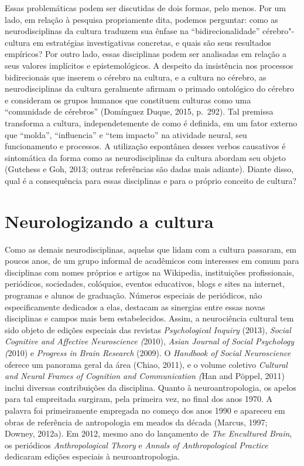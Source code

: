 Essas problemáticas podem ser discutidas de dois formas, pelo menos. Por
um lado, em relação à pesquisa propriamente dita, podemos perguntar:
como as neurodisciplinas da cultura traduzem sua ênfase na
``bidirecionalidade'' cérebro"-cultura em estratégias investigativas
concretas, e quais são seus resultados empíricos? Por outro lado, essas
disciplinas podem ser analisadas em relação a seus valores implícitos e
epistemológicos. A despeito da insistência nos processos bidirecionais
que inserem o cérebro na cultura, e a cultura no cérebro, as
neurodisciplinas da cultura geralmente afirmam o primado ontológico do
cérebro e consideram os grupos humanos que constituem culturas como uma
``comunidade de cérebros'' (Domínguez Duque, 2015, p.~292). Tal premissa
transforma a cultura, independetemente de como é definida, em um fator
externo que ``molda'', ``influencia'' e ``tem impacto'' na atividade
neural, seu funcionamento e processos. A utilização espontânea desses
verbos causativos é sintomática da forma como as neurodisciplinas da
cultura abordam seu objeto (Gutchess e Goh, 2013; outras referências são
dadas mais adiante). Diante disso, qual é a consequência para essas
disciplinas e para o próprio conceito de cultura?

\section{Neurologizando a cultura}

Como as demais neurodisciplinas, aquelas que lidam com a cultura
passaram, em poucos anos, de um grupo informal de acadêmicos com
interesses em comum para disciplinas com nomes próprios e artigos na
Wikipedia, instituições profissionais, periódicos, sociedades,
colóquios, eventos educativos, blogs e sites na internet, programas e
alunos de graduação. Números especiais de periódicos, não
especificamente dedicados a elas, destacam as sinergias entre essas
novas disciplinas e campos mais bem estabelecidos. Assim, a neurociência
cultural tem sido objeto de edições especiais das revistas
\emph{Psychological Inquiry} (2013), \emph{Social Cognitive and
Affective Neuroscience (}2010), \emph{Asian Journal of Social Psychology
(}2010) e \emph{Progress in Brain Research} (2009). O \emph{Handbook of
Social Neuroscience} oferece um panorama geral da área (Chiao, 2011), e
o volume coletivo \emph{Cultural and Neural Frames of Cognition and
Communication (}Han and Pöppel, 2011) inclui diversas contribuições da
disciplina. Quanto à neuroantropologia, os apelos para tal empreitada
surgiram, pela primeira vez, no final dos anos 1970. A palavra foi
primeiramente empregada no começo dos anos 1990 e apareceu em obras de
referência de antropologia em meados da década (Marcus, 1997; Downey,
2012a). Em 2012, mesmo ano do lançamento de \emph{The Encultured Brain},
os periódicos \emph{Anthropological Theory} e \emph{Annals of
Anthropological Practice} dedicaram edições especiais à
neuroantropologia.

